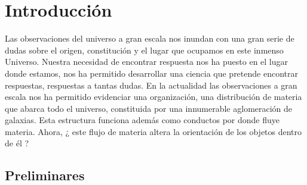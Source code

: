 



\chapter{Introducción}
\label{cha:Introduction}

Las observaciones del universo a gran escala nos inundan con una gran serie de dudas sobre el origen, constitución y el lugar que ocupamos en este inmenso Universo. Nuestra necesidad de encontrar respuesta nos ha puesto en el lugar donde estamos, nos ha permitido desarrollar una ciencia que pretende encontrar respuestas, respuestas a tantas dudas. En la actualidad las observaciones a gran escala nos ha permitido evidenciar una organización, una distribución de materia que abarca todo el universo, constituida por una innumerable aglomeración de galaxias. Esta estructura  funciona además como conductos por donde fluye materia. Ahora, ¿ este flujo de materia altera la orientación de los objetos dentro de él ?
 
\section{Preliminares }
\label{sec: prelimenares}
 
